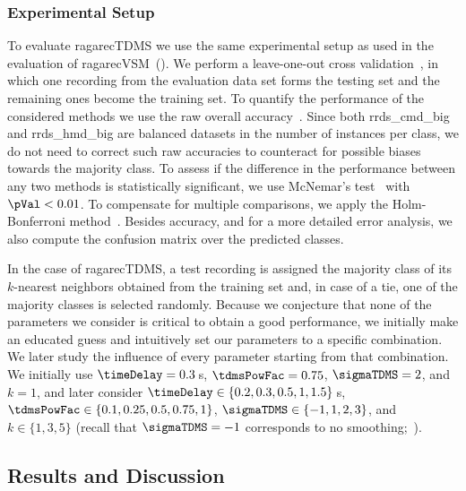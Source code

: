 

\subsubsection{Experimental Setup}
\label{sec:tdms_experimental_setup}

To evaluate \acrshort{ragarecTDMS} we use the same experimental setup as used in the evaluation of \acrshort{ragarecVSM}~(). We perform a leave-one-out cross validation~\citep{Mitchell97BOOK}, in which one recording from the evaluation data set forms the testing set and the remaining ones become the training set. To quantify the performance of the considered methods we use the raw overall accuracy~\citep{Mitchell97BOOK}. Since both \acrshort{rrds_cmd_big} and \acrshort{rrds_hmd_big} are balanced datasets in the number of instances per class, we do not need to correct such raw accuracies to counteract for possible biases towards the majority class. To assess if the difference in the performance between any two methods is statistically significant, we use McNemar's test~\citep{mcnemar1947note} with $\pVal < 0.01$. To compensate for multiple comparisons, we apply the Holm-Bonferroni method~\citep{holm1979simple}. Besides accuracy, and for a more detailed error analysis, we also compute the confusion matrix over the predicted classes.

In the case of \acrshort{ragarecTDMS}, a test recording is assigned the majority class of its $k$-nearest neighbors obtained from the training set and, in case of a tie, one of the majority classes is selected randomly. Because we conjecture that none of the parameters we consider is critical to obtain a good performance, we initially make an educated guess and intuitively set our parameters to a specific combination. We later study the influence of every parameter starting from that combination. We initially use $\timeDelay=0.3$\,s, $\tdmsPowFac=0.75$, $\sigmaTDMS=2$, and $k=1$, and later consider $\timeDelay\in\lbrace 0.2, 0.3, 0.5, 1, 1.5\rbrace$\,s, $\tdmsPowFac\in\lbrace 0.1, 0.25, 0.5, 0.75, 1 \rbrace$, $\sigmaTDMS\in\lbrace -1, 1, 2, 3\rbrace$, and $k\in\lbrace 1,3,5\rbrace$ (recall that $\sigmaTDMS=-1$ corresponds to no smoothing;~).



\subsection{Results and Discussion}
\label{sec:tdms_results_and_discussion}

